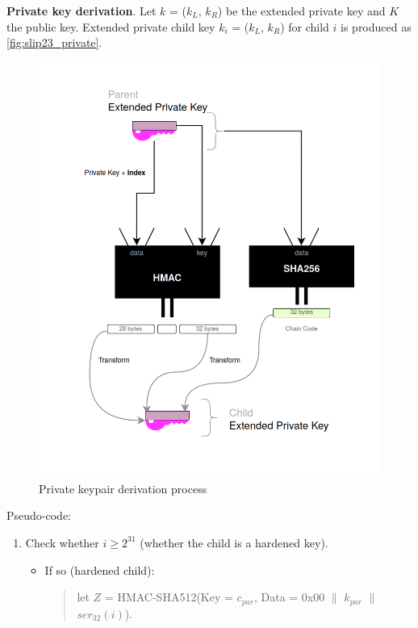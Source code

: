 \begin{adjustwidth}{0.5cm}{}
    \bigskip
    {\textbf{Private key derivation}}. Let $k$ = ($k_L$, $k_R$) be the extended private key and $K$ the public key. Extended private child key $k_i$ = ($k_L $, $k_R$) for child $i$ is produced as \autoref{fig:slip23_private}.
    \begin{figure}[ht!]
        \centering
        \includegraphics[width=1\textwidth]{images/slip23_private.png}
        \caption[Private keypair derivation process]{Private keypair derivation process}
        \label{fig:slip23_private}
    \end{figure}

    Pseudo-code:
    \begin{enumerate}
        \item Check whether $i \geq 2^{31}$ (whether the child is a hardened key).
              \begin{itemize}
                  \item If so (hardened child):
                        \begin{quote}
                            let $Z$ = HMAC-SHA512(Key = $c_{par}$, Data = 0x00 $\parallel$ $k_{par}$ $\parallel$ $ser_{32}(i)$).


\end{quote}
\end{itemize}
\end{enumerate}
\end{adjustwidth}
